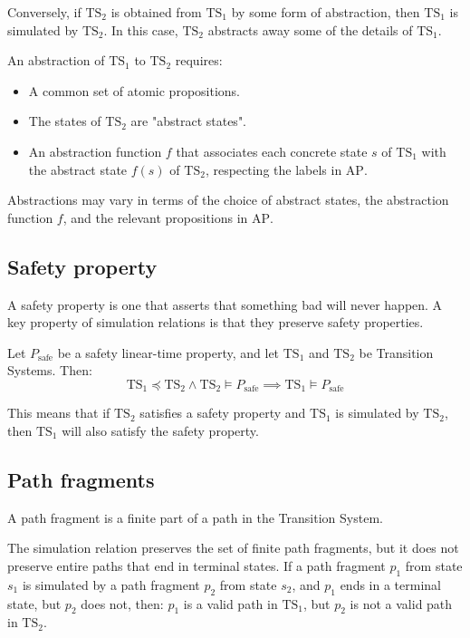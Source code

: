 \begin{definition}
    Conversely, if $\text{TS}_2$ is obtained from $\text{TS}_1$ by some form of abstraction, then $\text{TS}_1$ is simulated by $\text{TS}_2$.
    In this case, $\text{TS}_2$ abstracts away some of the details of $\text{TS}_1$.
\end{definition}
\noindent An abstraction of $\text{TS}_1$ to $\text{TS}_2$ requires:
\begin{itemize}
    \item A common set of atomic propositions.
    \item The states of $\text{TS}_2$ are "abstract states".
    \item An abstraction function $f$ that associates each concrete state $s$ of $\text{TS}_1$ with the abstract state $f(s)$ of $\text{TS}_2$, respecting the labels in $\text{AP}$.
\end{itemize}
\noindent Abstractions may vary in terms of the choice of abstract states, the abstraction function $f$, and the relevant propositions in $\text{AP}$.




\subsection{Safety property}
A safety property is one that asserts that something bad will never happen. 
A key property of simulation relations is that they preserve safety properties.
\begin{property}
    Let $P_{\text{safe}}$ be a safety linear-time property, and let $\text{TS}_1$ and $\text{TS}_2$ be Transition Systems.
    Then:
    \[\text{TS}_1\preceq \text{TS}_2\land\text{TS}_2\models P_{\text{safe}}\implies\text{TS}_1\models P_{\text{safe}} \]
\end{property}
\noindent This means that if $\text{TS}_2$ satisfies a safety property and $\text{TS}_1$ is simulated by $\text{TS}_2$, then $\text{TS}_1$ will also satisfy the safety property.

\subsection{Path fragments}
\begin{definition}
    A path fragment is a finite part of a path in the Transition System.
\end{definition}
\noindent The simulation relation preserves the set of finite path fragments, but it does not preserve entire paths that end in terminal states.
If a path fragment $p_1$ from state $s_1$ is simulated by a path fragment $p_2$ from state $s_2$, and $p_1$ ends in a terminal state, but $p_2$ does not, then: $p_1$ is a valid path in $\text{TS}_1$, but $p_2$ is not a valid path in  $\text{TS}_2$.

